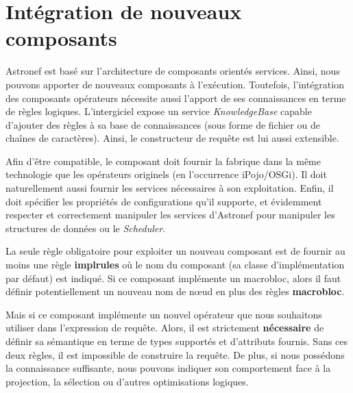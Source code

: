 \section{Intégration de nouveaux composants}\label{sec:contrib:astronef:integration}
Astronef est basé sur l'architecture de composants orientés services. Ainsi, nous pouvons apporter de nouveaux composants à l'exécution. Toutefois, l'intégration des composants opérateurs nécessite aussi l'apport de ses connaissances en terme de règles logiques. L'intergiciel expose un service \textit{KnowledgeBase} capable d'ajouter des règles à sa base de connaissances (sous forme de fichier ou de chaînes de caractères). Ainsi, le constructeur de requête est lui aussi extensible.

Afin d'être compatible, le composant doit fournir la fabrique dans la même technologie que les opérateurs originels (en l'occurrence iPojo/OSGi). Il doit naturellement aussi fournir les services nécessaires à son exploitation. Enfin, il doit spécifier les propriétés de configurations qu'il supporte, et évidemment respecter et correctement manipuler les services d'Astronef pour manipuler les structures de données ou le \textit{Scheduler}.

La seule règle obligatoire pour exploiter un nouveau composant est de fournir au moins une règle \textbf{implrules} où le nom du composant (sa classe d'implémentation par défaut) est indiqué. Si ce composant implémente un macrobloc, alors il faut définir potentiellement un nouveau nom de nœud en plus des règles \textbf{macrobloc}.

Mais si ce composant implémente un nouvel opérateur que nous souhaitons utiliser dans l'expression de requête. Alors, il est strictement \textbf{nécessaire} de définir sa sémantique en terme de types supportés et d'attributs fournis. Sans ces deux règles, il est impossible de construire la requête. De plus, si nous possédons la connaissance suffisante, nous pouvons indiquer son comportement face à la projection, la sélection ou d'autres optimisations logiques.
